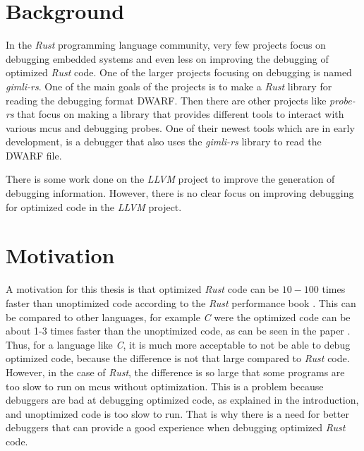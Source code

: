 \section{Background}
In the \emph{Rust} programming language community, very few projects focus on debugging embedded systems and even less on improving the debugging of optimized \emph{Rust} code.
One of the larger projects focusing on debugging is named \emph{gimli-rs}.
One of the main goals of the projects is to make a \emph{Rust} library for reading the debugging format \gls{DWARF}.
Then there are other projects like \emph{probe-rs} that focus on making a library that provides different tools to interact with various \glspl{mcu} and debugging probes.
One of their newest tools which are in early development, is a debugger that also uses the \emph{gimli-rs} library to read the DWARF file.


There is some work done on the \emph{LLVM} project to improve the generation of debugging information.
However, there is no clear focus on improving debugging for optimized code in the \emph{LLVM} project.


\section{Motivation}



A motivation for this thesis is that optimized \emph{Rust} code can be $10-100$ times faster than unoptimized code according to the \emph{Rust} performance book \cite{perf-book}.
This can be compared to other languages, for example \emph{C} were the optimized code can be about 1-3 times faster than the unoptimized code, as can be seen in the paper \cite{clang-opt}.
Thus, for a language like \emph{C}, it is much more acceptable to not be able to debug optimized code, because the difference is not that large compared to \emph{Rust} code.
However, in the case of \emph{Rust}, the difference is so large that some programs are too slow to run on \glspl{mcu} without optimization.
This is a problem because debuggers are bad at debugging optimized code, as explained in the introduction, and unoptimized code is too slow to run.
That is why there is a need for better debuggers that can provide a good experience when debugging optimized \emph{Rust} code.


